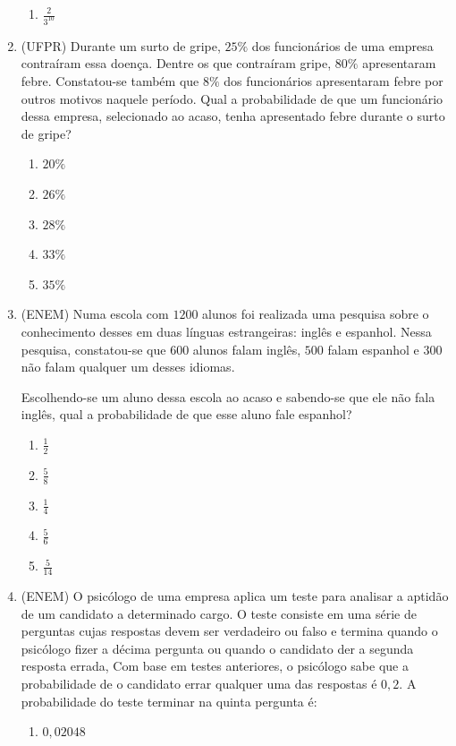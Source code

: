 \begin{enumerate}
\begin{enumerate}
\item {} 
\(\displaystyle\frac{2}{3^{10}}\)

\end{enumerate}

\item (UFPR) Durante um surto de gripe, $25\%$ dos funcionários de uma empresa contraíram essa doença. Dentre os que contraíram gripe, $80\%$ apresentaram febre. Constatou-se também que $8\%$ dos funcionários apresentaram febre por outros motivos naquele período. Qual a probabilidade de que um funcionário dessa empresa, selecionado ao acaso, tenha apresentado febre durante o surto de gripe?
\begin{enumerate}
\item {} 
$20\%$

\item {} 
$26\%$

\item {} 
$28\%$

\item {} 
$33\%$

\item {} 
$35\%$

\end{enumerate}

\item (ENEM) Numa escola com $1200$ alunos foi realizada uma pesquisa sobre o conhecimento desses em duas línguas estrangeiras: inglês e espanhol. Nessa pesquisa, constatou-se que $600$ alunos falam inglês, $500$ falam espanhol e $300$ não falam qualquer um desses idiomas.

Escolhendo-se um aluno dessa escola ao acaso e sabendo-se que ele não fala inglês, qual a probabilidade de que esse aluno fale espanhol?
\begin{enumerate}
\item {} 
\(\frac{1}{2}\)

\item {} 
\(\frac{5}{8}\)

\item {} 
\(\frac{1}{4}\)

\item {} 
\(\frac{ 5}{6}\)

\item {} 
\(\frac{5}{14}\)

\end{enumerate}

\clearpage
\item (ENEM) O psicólogo de uma empresa aplica um teste para analisar a aptidão de um candidato a determinado cargo. O teste consiste em uma série de perguntas cujas respostas devem ser verdadeiro ou falso e termina quando o psicólogo fizer a décima pergunta ou quando o candidato der a segunda resposta errada, Com base em testes anteriores, o psicólogo sabe que a probabilidade de o candidato errar qualquer uma das respostas é $0{,}2$. A probabilidade do teste terminar na quinta pergunta é:
\begin{enumerate}
\item {} 
$0{,}02048$


\end{enumerate}
\end{enumerate}
